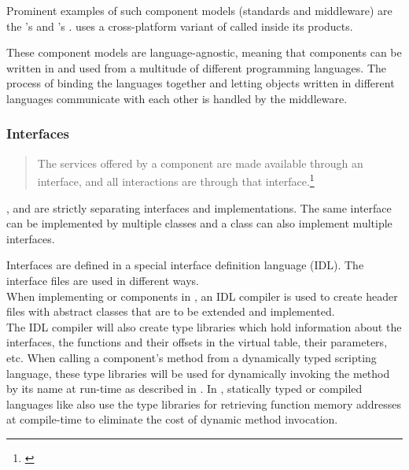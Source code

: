 Prominent examples of such component models (standards and middleware) are the 's  and 's .  uses a cross-platform variant of  called  inside its products.

These component models are language-agnostic, meaning that components can be written in and used from a multitude of different programming languages. The process of binding the languages together and letting objects written in different languages communicate with each other is handled by the middleware.

\subsubsection{Interfaces}

\begin{quotation}
The services offered by a component are made available through an interface, and all interactions are through that interface.\footnote{\citep[444]{Sommerville}}
\end{quotation}

,  and  are strictly separating interfaces and implementations. The same interface can be implemented by multiple classes and a class can also implement multiple interfaces.

Interfaces are defined in a special interface definition language (IDL). The interface files are used in different ways.\\
When implementing  or  components in , an IDL compiler is used to create header files with abstract classes that are to be extended and implemented.\\
The IDL compiler will also create type libraries which hold information about the interfaces, the functions and their offsets in the virtual table, their parameters, etc. When calling a component's method from a dynamically typed scripting language, these type libraries will be used for dynamically invoking the method by its name at run-time as described in . In , statically typed or compiled languages like  also use the type libraries for retrieving function memory addresses at compile-time to eliminate the cost of dynamic method invocation.  

